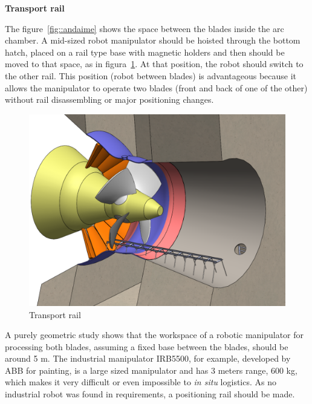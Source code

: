 \textbf{Transport rail}

The figure~\ref{fig::andaime} shows the space between the blades inside the
arc chamber. A mid-sized robot manipulator should be hoisted through the bottom
hatch, placed on a rail type base with magnetic holders and then should be moved
to that space, as in figura~\ref{fig::rail1}. At that position, the robot should
switch to the other rail. This position (robot between blades) is advantageous because it
allows the manipulator to operate two blades (front and back of one of the
other) without rail disassembling or major positioning changes.

\begin{figure}[h!]	
	\includegraphics[width=\columnwidth]{figs/manipuladores/rail1.PNG}
	\caption{Transport rail}
	\label{fig::rail1}
\end{figure}


A purely geometric study shows that the workspace of a robotic manipulator
for processing both blades, assuming a fixed base between the blades, should be
around 5 m. The industrial manipulator IRB5500, for example, developed by ABB
for painting, is a large sized manipulator and has 3 meters range, 600 kg,
which makes it very difficult or even impossible to \textit{in situ} logistics.
As no industrial robot was found in requirements, a positioning rail should be
made.


